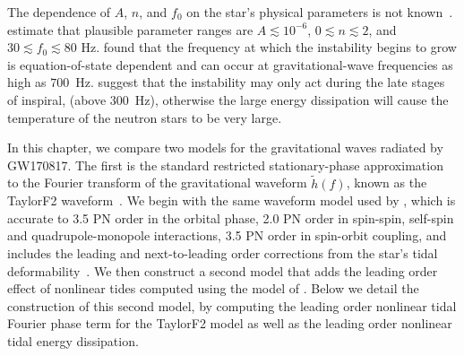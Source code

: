 The dependence of $A$, $n$, and $f_0$ on the star's physical parameters is not known~\citep{Weinberg:2015pxa}. \cite{Essick:2016tkn} estimate that plausible parameter ranges are $A \lesssim 10^{-6}$, $0 \lesssim n \lesssim 2$, and $30 \lesssim f_0 \lesssim 80$ Hz. \cite{Zhou:2018tvc} found that the frequency at which the instability begins to grow is equation-of-state dependent and can occur at gravitational-wave frequencies as high as $700$~Hz. \cite{Andersson:2017iav} suggest that the instability may only act during the late stages of inspiral, (above $300$~Hz), otherwise the large energy dissipation will cause the temperature of the neutron stars to be very large. 

In this chapter, we compare two models for the gravitational waves radiated by GW170817. The first is the standard restricted stationary-phase approximation to the Fourier transform of the gravitational waveform $\tilde{h}(f)$, known as the TaylorF2 waveform~\citep{Sathyaprakash:1991mt}. We begin with the same waveform model used by \cite{de2018tidal}, which is accurate to 3.5 PN order in the orbital phase, 2.0 PN order in spin-spin, self-spin and quadrupole-monopole interactions, 3.5 PN order in spin-orbit coupling, and includes the leading and next-to-leading order corrections from the star's tidal deformability~\citep{Kidder:1992fr,Blanchet:1995ez,Blanchet:2004ek,Buonanno:2009zt,Arun:2008kb,Marsat:2013caa,Bohe:2013cla,Bohe:2015ana,Mikoczi:2005dn, Flanagan:2007ix,Vines:2011ud}. We then construct a second model that adds the leading order effect of nonlinear tides computed using the model of \cite{Essick:2016tkn}. Below we detail the construction of this second model, by computing the leading order nonlinear tidal Fourier phase term for the TaylorF2 model as well as the leading order nonlinear tidal energy dissipation.

